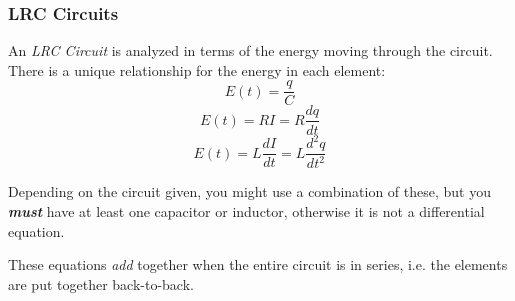 		\subsubsection{LRC Circuits} \label{subsubsec:LRC Circuits}
			\begin{definition} \label{def:LRC Circuits}
				An \emph{LRC Circuit} is analyzed in terms of the energy moving through the circuit.
				There is a unique relationship for the energy in each element:
				\begin{equation} \label{eq:Energy in Capacitor}
					E \left( t \right) = \frac{q}{C}
				\end{equation}
				\begin{equation} \label{eq:Energy in Resistor}
					E \left( t \right) = RI = R \frac{dq}{dt}
				\end{equation}
				\begin{equation} \label{eq:Energy in Inductor}
					E \left( t \right) = L \frac{dI}{dt} = L \frac{d^{2}q}{dt^{2}}
				\end{equation}
				\begin{remark}
					Depending on the circuit given, you might use a combination of these, but you \emph{\textbf{must}} have at least one capacitor or inductor, otherwise it is not a differential equation.
				\end{remark}
				\begin{remark}
					These equations \emph{add} together when the entire circuit is in series, i.e. the elements are put together back-to-back.
				\end{remark}
			\end{definition}
	
